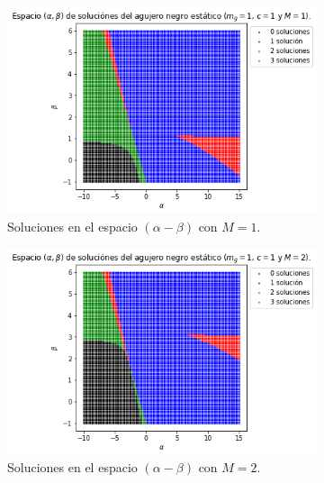  \begin{figure}[H]
    
    \centering
     \begin{subfigure}[b]{0.4\textwidth}
         \includegraphics[scale=0.45]{SoluciónEstática/Horizonte de Eventos/HorizonsNum1.png}
         \caption{Soluciones en el espacio $(\alpha-\beta)$ con $M=1$.}
         \label{fig:M1}
     \end{subfigure}
     \hspace{1cm}
     \begin{subfigure}[b]{0.4\textwidth}
         \includegraphics[scale=0.45]{SoluciónEstática/Horizonte de Eventos/HorizonsNum2.png}
         \caption{Soluciones en el espacio $(\alpha-\beta)$ con $M=2$.}
         \label{fig:M2}
     \end{subfigure}    
      \hfill
      \begin{subfigure}[b]{0.4\textwidth}

\end{subfigure}
\end{figure}
